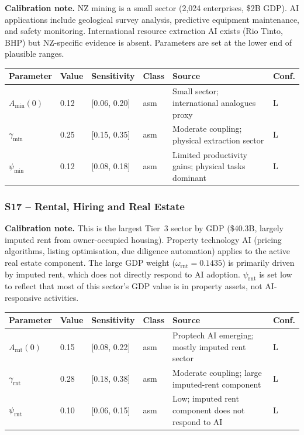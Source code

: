 \documentclass[11pt,a4paper]{article}
\begin{document}
\textbf{Calibration note.} NZ mining is a small sector (2,024 enterprises, \$2B GDP). AI applications include geological survey analysis, predictive equipment maintenance, and safety monitoring. International resource extraction AI exists (Rio Tinto, BHP) but NZ-specific evidence is absent. Parameters are set at the lower end of plausible ranges.

\begin{center}
\begin{tabular}{llllll}
\toprule
Parameter & Value & Sensitivity & Class & Source & Conf.\\
\midrule
$A_{\text{min}}(0)$ & 0.12 & [0.06, 0.20] & asm & Small sector; international analogues proxy & L \\
$\gamma_{\text{min}}$ & 0.25 & [0.15, 0.35] & asm & Moderate coupling; physical extraction sector & L \\
$\psi_{\text{min}}$ & 0.12 & [0.08, 0.18] & asm & Limited productivity gains; physical tasks dominant & L \\
\bottomrule
\end{tabular}
\end{center}

\subsubsection*{S17 -- Rental, Hiring and Real Estate}

\textbf{Calibration note.} This is the largest Tier~3 sector by GDP (\$40.3B, largely imputed rent from owner-occupied housing). Property technology AI (pricing algorithms, listing optimisation, due diligence automation) applies to the active real estate component. The large GDP weight ($\omega_{\text{rnt}} = 0.1435$) is primarily driven by imputed rent, which does not directly respond to AI adoption. $\psi_{\text{rnt}}$ is set low to reflect that most of this sector's GDP value is in property assets, not AI-responsive activities.

\begin{center}
\begin{tabular}{llllll}
\toprule
Parameter & Value & Sensitivity & Class & Source & Conf.\\
\midrule
$A_{\text{rnt}}(0)$ & 0.15 & [0.08, 0.22] & asm & Proptech AI emerging; mostly imputed rent sector & L \\
$\gamma_{\text{rnt}}$ & 0.28 & [0.18, 0.38] & asm & Moderate coupling; large imputed-rent component & L \\
$\psi_{\text{rnt}}$ & 0.10 & [0.06, 0.15] & asm & Low; imputed rent component does not respond to AI & L \\
\bottomrule
\end{tabular}
\end{center}
\end{document}
